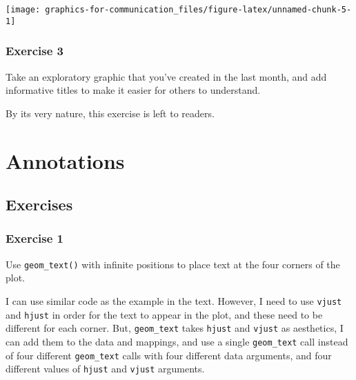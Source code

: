 \documentclass[]{book}
\theoremstyle{plain}
\theoremstyle{remark}
\theoremstyle{definition}
\theoremstyle{definition}
\theoremstyle{definition}
\theoremstyle{remark}
\begin{document}
\begin{center}\texttt{[image: graphics-for-communication\_files/figure-latex/unnamed-chunk-5-1]} \end{center}

\hypertarget{exercise-3-58}{%
\subsubsection{Exercise 3}\label{exercise-3-58}}

Take an exploratory graphic that you've created in the last month, and
add informative titles to make it easier for others to understand.

By its very nature, this exercise is left to readers.

\hypertarget{annotations}{%
\section{Annotations}\label{annotations}}

\hypertarget{exercises-8}{%
\subsection{Exercises}\label{exercises-8}}

\hypertarget{exercise-1-74}{%
\subsubsection{Exercise 1}\label{exercise-1-74}}

Use \texttt{geom\_text()} with infinite positions to place text at the
four corners of the plot.

I can use similar code as the example in the text. However, I need to
use \texttt{vjust} and \texttt{hjust} in order for the text to appear in
the plot, and these need to be different for each corner. But,
\texttt{geom\_text} takes \texttt{hjust} and \texttt{vjust} as
aesthetics, I can add them to the data and mappings, and use a single
\texttt{geom\_text} call instead of four different \texttt{geom\_text}
calls with four different data arguments, and four different values of
\texttt{hjust} and \texttt{vjust} arguments.
\end{document}
